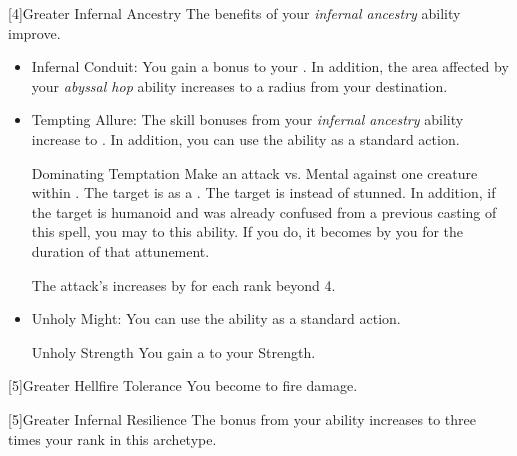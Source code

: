             [4]{Greater Infernal Ancestry} The benefits of your \textit{infernal ancestry} ability improve.
            \begin{itemize}
                \item Infernal Conduit: You gain a  bonus to your .
                    In addition, the area affected by your \textit{abyssal hop} ability increases to a \smallarea radius from your destination.
                \item Tempting Allure: The skill bonuses from your \textit{infernal ancestry} ability increase to .
                    In addition, you can use the  ability as a standard action.
                    \begin{magicalactiveability}{Dominating Temptation}
                        \rankline
                        \noindent
                        Make an attack vs. Mental against one creature within \shortrange.%
                        \vspace{0.25em}
                        \hit The target is \stunned as a .
                        \crit The target is \confused instead of stunned.
                        In addition, if the target is humanoid and was already confused from a previous casting of this spell, you may  to this ability.
                        If you do, it becomes \dominated by you for the duration of that attunement.

                        \rankline
                        \noindent The attack's  increases by  for each rank beyond 4.
                        \vspace{0.1em}
                    \end{magicalactiveability}
                \item Unholy Might: You can use the  ability as a standard action.
                    \begin{magicalattuneability}{Unholy Strength}{}
                        \rankline
                        You gain a   to your Strength.
                    \end{magicalattuneability}
            \end{itemize}

            [5]{Greater Hellfire Tolerance} You become  to fire damage.

            [5]{Greater Infernal Resilience}  The bonus from your  ability increases to three times your rank in this archetype.


